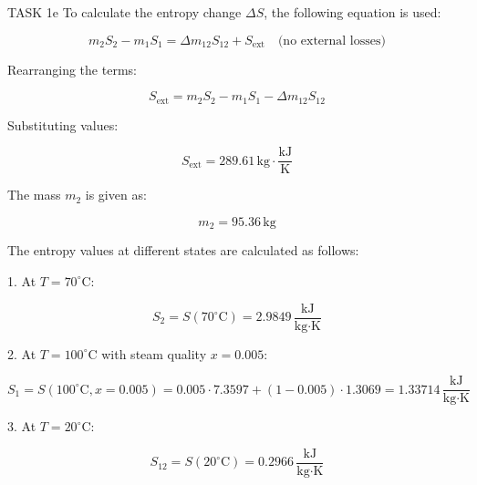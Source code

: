 TASK 1e  
To calculate the entropy change \( \Delta S \), the following equation is used:  

\[
m_{2} S_{2} - m_{1} S_{1} = \Delta m_{12} S_{12} + S_{\text{ext}} \quad \text{(no external losses)}
\]

Rearranging the terms:  

\[
S_{\text{ext}} = m_{2} S_{2} - m_{1} S_{1} - \Delta m_{12} S_{12}
\]

Substituting values:  

\[
S_{\text{ext}} = 289.61 \, \text{kg} \cdot \frac{\text{kJ}}{\text{K}}
\]

The mass \( m_2 \) is given as:  

\[
m_2 = 95.36 \, \text{kg}
\]

The entropy values at different states are calculated as follows:  

1. At \( T = 70^\circ\text{C} \):  

\[
S_2 = S(70^\circ\text{C}) = 2.9849 \, \frac{\text{kJ}}{\text{kg·K}}
\]

2. At \( T = 100^\circ\text{C} \) with steam quality \( x = 0.005 \):  

\[
S_1 = S(100^\circ\text{C}, x = 0.005) = 0.005 \cdot 7.3597 + (1 - 0.005) \cdot 1.3069 = 1.33714 \, \frac{\text{kJ}}{\text{kg·K}}
\]

3. At \( T = 20^\circ\text{C} \):  

\[
S_{12} = S(20^\circ\text{C}) = 0.2966 \, \frac{\text{kJ}}{\text{kg·K}}
\]